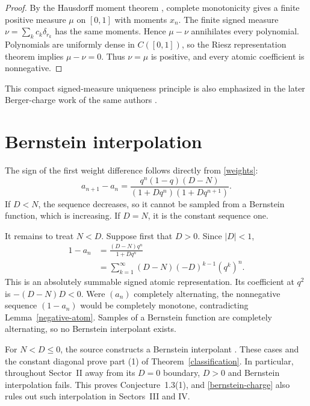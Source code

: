 \documentclass[11pt]{article}
\begin{document}
\begin{proof}
By the Hausdorff moment theorem \cite[Chapter~III]{Akhiezer}, complete
monotonicity gives a finite positive measure $\mu$ on $[0,1]$ with moments
$x_n$.  The finite signed measure $\nu=\sum_kc_k\delta_{r_k}$ has the same
moments.  Hence $\mu-\nu$ annihilates every polynomial.  Polynomials are
uniformly dense in $C([0,1])$, so the Riesz representation theorem implies
$\mu-\nu=0$.  Thus $\nu=\mu$ is positive, and every atomic coefficient is
nonnegative.
\end{proof}

This compact signed-measure uniqueness principle is also emphasized in the
later Berger-charge work of the same authors \cite{Charges}.

\section{Bernstein interpolation}

The sign of the first weight difference follows directly from \eqref{weights}:
\begin{equation}\label{weight-difference}
 a_{n+1}-a_n
 =\frac{q^n(1-q)(D-N)}
 {(1+Dq^n)(1+Dq^{n+1})}.
\end{equation}
If $D<N$, the sequence decreases, so it cannot be sampled from a Bernstein
function, which is increasing.  If $D=N$, it is the constant sequence one.

It remains to treat $N<D$.  Suppose first that $D>0$.  Since $|D|<1$,
\begin{align}\label{bernstein-charge}
 1-a_n
 &=\frac{(D-N)q^n}{1+Dq^n}\\
 &=\sum_{k=1}^\infty (D-N)(-D)^{k-1}(q^k)^n.
\end{align}
This is an absolutely summable signed atomic representation.  Its coefficient
at $q^2$ is $-(D-N)D<0$.  Were $(a_n)$ completely alternating, the
nonnegative sequence $(1-a_n)$ would be completely monotone, contradicting
Lemma~\ref{negative-atom}.  Samples of a Bernstein function are completely
alternating, so no Bernstein interpolant exists.

For $N<D\leq0$, the source constructs a Bernstein interpolant
\cite[Corollary~2.6]{GRWS}.  These cases and the constant diagonal prove part
(1) of Theorem~\ref{classification}.  In particular, throughout Sector~II
away from its $D=0$ boundary, $D>0$ and Bernstein interpolation fails.  This
proves Conjecture~1.3(1), and \eqref{bernstein-charge} also rules out such
interpolation in Sectors~III and IV.
\end{document}
